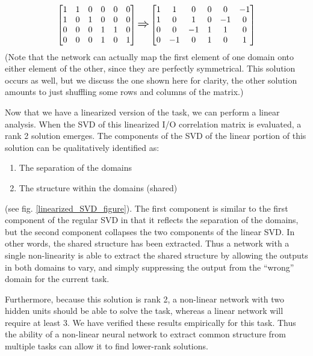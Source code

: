 \documentclass[10pt,letterpaper]{article}
\begin{document}
\[
\left[ \begin{matrix} 
1 & 1 & 0 & 0 & 0 & 0 \\
1 & 0 & 1 & 0 & 0 & 0 \\
 0 & 0 & 0 & 1 & 1 & 0\\
 0 & 0 & 0 & 1 & 0 & 1\\
\end{matrix}  \right] 
\mathlarger{\mathlarger{\Rightarrow}}
\left[ \begin{matrix} 
1 & 1 & 0 & 0 & 0 & -1 \\
1 & 0 & 1 & 0 & -1 & 0 \\
 0 & 0 & -1 & 1 & 1 & 0\\
 0 & -1 & 0 & 1 & 0 & 1\\
\end{matrix}  \right] 
\] 
(Note that the network can actually map the first element of one domain onto either element of the other, since they are perfectly symmetrical. This solution occurs as well, but we discuss the one shown here for clarity, the other solution amounts to just shuffling some rows and columns of the matrix.)\par
Now that we have a linearized version of the task, we can perform a linear analysis. When the SVD of this linearized I/O correlation matrix is evaluated, a rank 2 solution emerges. The components of the SVD of the linear portion of this solution can be qualitatively identified as: \begin{enumerate}
\item The separation of the domains
\item The structure within the domains (shared)
\end{enumerate}
(see fig. \ref{linearized_SVD_figure}). The first component is similar to the first component of the regular SVD in that it reflects the separation of the domains, but the second component collapses the two components of the linear SVD. In other words, the shared structure has been extracted. Thus a network with a single non-linearity is able to extract the shared structure by allowing the outputs in both domains to vary, and simply suppressing the output from the ``wrong'' domain for the current task.\par
Furthermore, because this solution is rank 2, a non-linear network with two hidden units should be able to solve the task, whereas a linear network will require at least 3. We have verified these results empirically for this task. Thus the ability of a non-linear neural network to extract common structure from multiple tasks can allow it to find lower-rank solutions.
 
\end{document}
